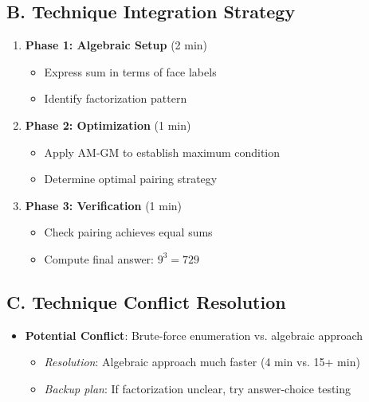 \documentclass[]{article}
\begin{document}
\begin{techniquesbox}
\subsection*{B. Technique Integration Strategy}
\begin{enumerate}
    \item \textbf{Phase 1: Algebraic Setup} (2 min)
    \begin{itemize}
        \item Express sum in terms of face labels
        \item Identify factorization pattern
    \end{itemize}
    
    \item \textbf{Phase 2: Optimization} (1 min)
    \begin{itemize}
        \item Apply AM-GM to establish maximum condition
        \item Determine optimal pairing strategy
    \end{itemize}
    
    \item \textbf{Phase 3: Verification} (1 min)
    \begin{itemize}
        \item Check pairing achieves equal sums
        \item Compute final answer: $9^3 = 729$
    \end{itemize}
\end{enumerate}

\subsection*{C. Technique Conflict Resolution}
\begin{itemize}[leftmargin=*]
    \item \textbf{Potential Conflict}: Brute-force enumeration vs. algebraic approach
    \begin{itemize}
        \item \textit{Resolution}: Algebraic approach much faster (4 min vs. 15+ min)
        \item \textit{Backup plan}: If factorization unclear, try answer-choice testing
    \end{itemize}
\end{itemize}
\end{techniquesbox}
\end{document}
